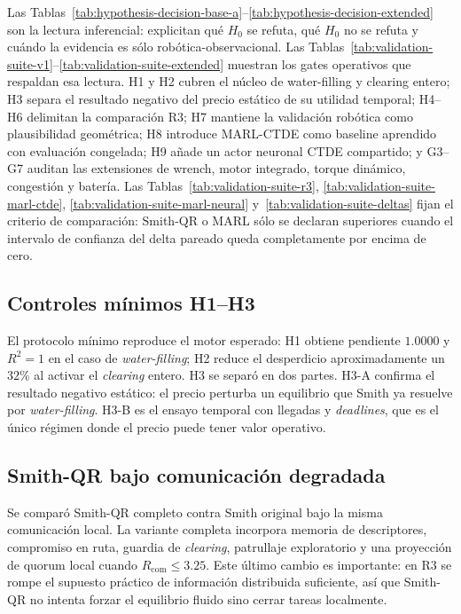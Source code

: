 Las Tablas~\ref{tab:hypothesis-decision-base-a}--\ref{tab:hypothesis-decision-extended}
son la lectura inferencial: explicitan qué $H_0$ se refuta, qué $H_0$ no se refuta y
cuándo la evidencia es sólo robótica-observacional. Las
Tablas~\ref{tab:validation-suite-v1}--\ref{tab:validation-suite-extended} muestran los
gates operativos que respaldan esa lectura. H1 y H2 cubren el núcleo de water-filling y
clearing entero; H3 separa el resultado negativo del precio estático de su utilidad
temporal; H4--H6 delimitan la comparación R3; H7 mantiene la validación robótica como
plausibilidad geométrica; H8 introduce MARL-CTDE como baseline aprendido con evaluación
congelada; H9 añade un actor neuronal CTDE compartido; y G3--G7 auditan las extensiones de wrench, motor integrado, torque dinámico,
congestión y batería. Las Tablas~\ref{tab:validation-suite-r3},
\ref{tab:validation-suite-marl-ctde}, \ref{tab:validation-suite-marl-neural}
y~\ref{tab:validation-suite-deltas} fijan el
criterio de comparación: Smith-QR o MARL sólo se declaran superiores cuando el intervalo
de confianza del delta pareado queda completamente por encima de cero.

\subsection{Controles mínimos H1--H3}

El protocolo mínimo reproduce el motor esperado:
H1 obtiene pendiente $1.0000$ y $R^2=1$ en el caso de \emph{water-filling}; H2 reduce el
desperdicio aproximadamente un $32\%$ al activar el \emph{clearing} entero. H3 se separó
en dos partes. H3-A confirma el resultado negativo estático: el precio perturba un
equilibrio que Smith ya resuelve por \emph{water-filling}. H3-B es el ensayo temporal con
llegadas y \emph{deadlines}, que es el único régimen donde el precio puede tener valor
operativo.

\subsection{Smith-QR bajo comunicación degradada}

Se comparó Smith-QR completo contra Smith original bajo la misma comunicación local. La
variante completa incorpora memoria de descriptores, compromiso en ruta, guardia de
\emph{clearing}, patrullaje exploratorio y una proyección de quorum local cuando
$R_{\mathrm{com}}\leq 3.25$. Este último cambio es importante: en R3 se rompe el supuesto
práctico de información distribuida suficiente, así que Smith-QR no intenta forzar el
equilibrio fluido sino cerrar tareas localmente.

